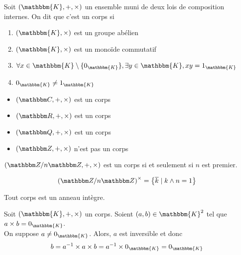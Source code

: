 \begin{defn}
	Soit $(\mathbbm{K}, +, \times)$ un ensemble muni de deux lois de composition internes. On dit que c'est un corps si
	 \begin{enumerate}
		\item $(\mathbbm{K}, \times)$ est un groupe abélien
		\item $(\mathbbm{K}, \times)$ est un monoïde commutatif
		\item $\forall x \in \mathbbm{K}\setminus \{0_\mathbbm{K}\}, \exists y \in \mathbbm{K}, xy = 1_\mathbbm{K}$
		\item $0_\mathbbm{K} \neq  1_\mathbbm{K}$
	\end{enumerate}
\end{defn}

\begin{exm}
	\begin{itemize}
		\item $(\C, +, \times)$ est un corps
		\item $(\R, +, \times)$ est un corps
		\item $(\Q, +, \times)$ est un corps
		\item $(\Z, +, \times)$ n'est pas un corps
	\end{itemize}
\end{exm}

\begin{prop}
	$(\Z / n\Z, +, \times)$ est un corps si et seulement si $n$ est premier.
\end{prop}

\begin{prv}
	\[
		\left( \Z / n\Z \right)^\times = \left\{ \overline{k}  \mid k \wedge n = 1 \right\}
	\] 
\end{prv}


\begin{prop}
	Tout corps est un anneau intègre.
\end{prop}

\begin{prv}
	Soit $(\mathbbm{K}, +, \times)$ un corps. Soient $(a,b) \in \mathbbm{K}^2$ tel que $a \times b = 0_\mathbbm{K}$.\\
	On suppose $a \neq  0_\mathbbm{K}$. Alors, $a$ est inversible et donc \[
		b = a^{-1} \times a \times b = a^{-1} \times 0_\mathbbm{K} = 0_\mathbbm{K}
	\] 
\end{prv}

